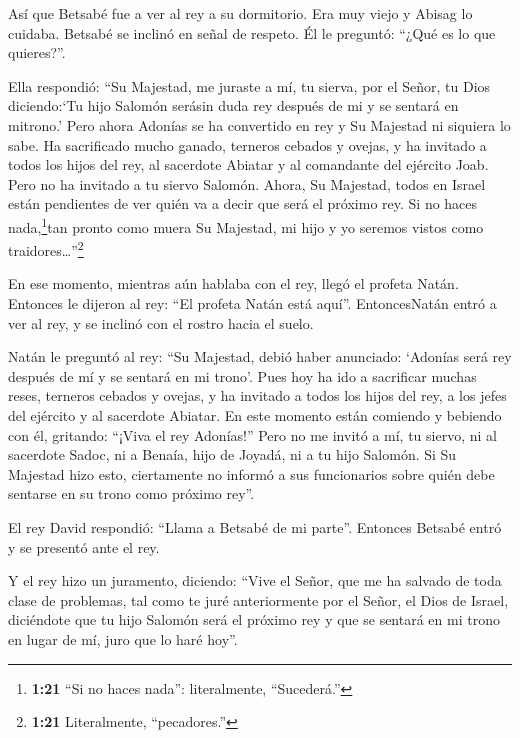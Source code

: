  Así que Betsabé fue a ver al rey a su dormitorio. Era muy
viejo y Abisag lo cuidaba.  Betsabé se inclinó en señal de
respeto. Él le preguntó: ``¿Qué es lo que quieres?''.

 Ella respondió: ``Su Majestad, me juraste a mí, tu sierva,
por el Señor, tu Dios diciendo:`Tu hijo Salomón serásin duda rey después
de mi y se sentará en mitrono.'  Pero ahora Adonías se ha
convertido en rey y Su Majestad ni siquiera lo sabe.  Ha
sacrificado mucho ganado, terneros cebados y ovejas, y ha invitado a
todos los hijos del rey, al sacerdote Abiatar y al comandante del
ejército Joab. Pero no ha invitado a tu siervo Salomón. 
Ahora, Su Majestad, todos en Israel están pendientes de ver quién va a
decir que será el próximo rey.  Si no haces
nada,\footnote{\textbf{1:21} ``Si no haces nada'': literalmente,
  ``Sucederá.''}tan pronto como muera Su Majestad, mi hijo y yo seremos
vistos como traidores\ldots{}''\footnote{\textbf{1:21} Literalmente,
  ``pecadores.''}

 En ese momento, mientras aún hablaba con el rey, llegó el
profeta Natán.  Entonces le dijeron al rey: ``El profeta
Natán está aquí''. EntoncesNatán entró a ver al rey, y se inclinó con el
rostro hacia el suelo.

 Natán le preguntó al rey: ``Su Majestad, debió haber
anunciado: `Adonías será rey después de mí y se sentará en mi trono'.
 Pues hoy ha ido a sacrificar muchas reses, terneros
cebados y ovejas, y ha invitado a todos los hijos del rey, a los jefes
del ejército y al sacerdote Abiatar. En este momento están comiendo y
bebiendo con él, gritando: ``¡Viva el rey Adonías!''  Pero
no me invitó a mí, tu siervo, ni al sacerdote Sadoc, ni a Benaía, hijo
de Joyadá, ni a tu hijo Salomón.  Si Su Majestad hizo esto,
ciertamente no informó a sus funcionarios sobre quién debe sentarse en
su trono como próximo rey''.

 El rey David respondió: ``Llama a Betsabé de mi parte''.
Entonces Betsabé entró y se presentó ante el rey.

 Y el rey hizo un juramento, diciendo: ``Vive el Señor, que
me ha salvado de toda clase de problemas, tal como te juré anteriormente
por el Señor, el Dios de Israel,  diciéndote que tu hijo
Salomón será el próximo rey y que se sentará en mi trono en lugar de mí,
juro que lo haré hoy''.

